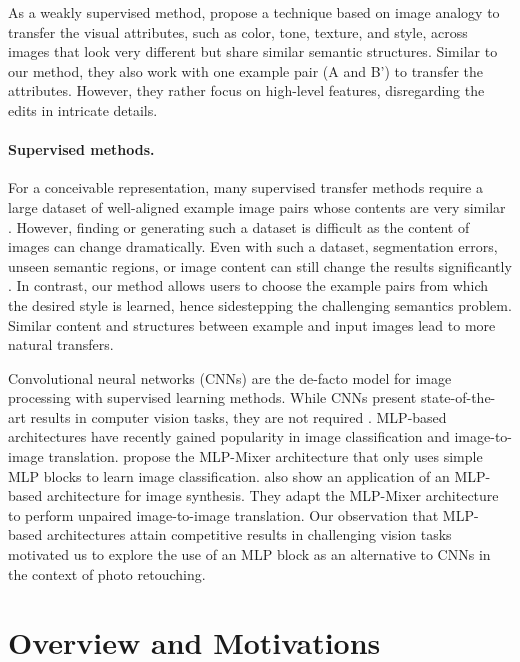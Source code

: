 As a weakly supervised method, \citeauthor{visual_attribute} \cite{visual_attribute} propose a technique based on image analogy \cite{Hertzmann01Image} to transfer the visual attributes, such as color, tone, texture, and style, across images that look very different but share similar semantic structures. Similar to our method, they also work with one example pair (A and B') to transfer the attributes. However, they rather focus on high-level features, disregarding the edits in intricate details.

\paragraph{Supervised methods.} 
For a conceivable representation, many supervised transfer methods require a large dataset of well-aligned example image pairs whose contents are very similar \cite{kim2021representative, wang2019underexposed}. However, finding or generating such a dataset is difficult as the content of images can change dramatically. Even with such a dataset, segmentation errors, unseen semantic regions, or image content can still change the results significantly \cite{10.1145/2790296}. In contrast, our method allows users to choose the example pairs from which the desired style is learned, hence sidestepping the challenging semantics problem. Similar content and structures between example and input images lead to more natural transfers.


Convolutional neural networks (CNNs) are the de-facto model for image processing with supervised learning methods. While CNNs present state-of-the-art results in computer vision tasks, they are not required \cite{tolstikhin2021mlp}. MLP-based architectures have recently gained popularity in image classification and image-to-image translation. \citeauthor{cazenavette2021mixergan} \cite{cazenavette2021mixergan} propose the MLP-Mixer architecture that only uses simple MLP blocks to learn image classification. \citeauthor{cazenavette2021mixergan} \cite{cazenavette2021mixergan} also show an application of an MLP-based architecture for image synthesis. They adapt the MLP-Mixer architecture \cite{tolstikhin2021mlp} to perform unpaired image-to-image translation. Our observation that MLP-based architectures attain competitive results in challenging vision tasks motivated us to explore the use of an MLP block as an alternative to CNNs in the context of photo retouching.

\section{Overview and Motivations}
\label{chap:motivations}

